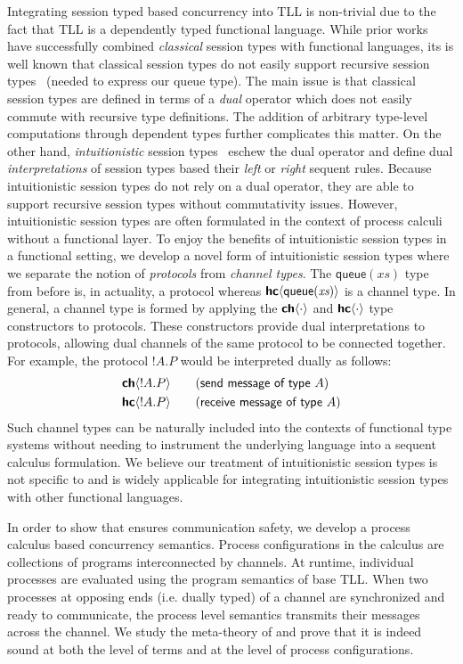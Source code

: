 Integrating session typed based concurrency into TLL is non-trivial due to the
fact that TLL is a dependently typed functional language. While prior
works~\cite{gay10,wadler12} have successfully combined \emph{classical} session
types with functional languages, its is well known that classical session types
do not easily support recursive session types~\cite{gay20} (needed to express
our \textsf{queue} type).  The main issue is that classical session types are
defined in terms of a \emph{dual} operator which does not easily commute with
recursive type definitions. The addition of arbitrary type-level computations
through dependent types further complicates this matter.  On the other hand,
\emph{intuitionistic} session types~\cite{caires10} eschew the dual operator and
define dual \emph{interpretations} of session types based their \emph{left} or
\emph{right} sequent rules.  Because intuitionistic session types do not rely on
a dual operator, they are able to support recursive session types without
commutativity issues. However, intuitionistic session types are often formulated
in the context of process calculi without a functional layer. To enjoy the
benefits of intuitionistic session types in a functional setting, we develop a
novel form of intuitionistic session types where we separate the notion of
\emph{protocols} from \emph{channel types}. The $\textsf{queue}(\textit{xs})$
type from before is, in actuality, a protocol whereas
${\textbf{\textsf{hc}}\langle{\textsf{queue}(\textit{xs})}\rangle}$ is a channel type. In general, a channel type
is formed by applying the ${\textbf{\textsf{ch}}\langle{\cdot}\rangle}$ and ${\textbf{\textsf{hc}}\langle{\cdot}\rangle}$ type constructors to
protocols. These constructors provide dual interpretations to protocols,
allowing dual channels of the same protocol to be connected together. For
example, the protocol $!A. P$ would be interpreted dually as follows:
\begin{alignat*}{2}
  &{\textbf{\textsf{ch}}\langle{!A. P}\rangle}\quad &&(\textsf{send message of type } A) \\
  &{\textbf{\textsf{hc}}\langle{!A. P}\rangle}\quad &&(\textsf{receive message of type } A)
\end{alignat*}
Such channel types can be naturally included into the contexts of functional
type systems without needing to instrument the underlying language into a
sequent calculus formulation.  We believe our treatment of intuitionistic
session types is not specific to \TLLC{} and is widely applicable for
integrating intuitionistic session types with other functional languages.

In order to show that \TLLC{} ensures communication safety, we develop a process
calculus based concurrency semantics. Process configurations in the calculus are
collections of \TLLC{} programs interconnected by channels. At runtime,
individual processes are evaluated using the program semantics of base TLL. When
two processes at opposing ends (i.e. dually typed) of a channel are synchronized
and ready to communicate, the process level semantics transmits their messages
across the channel. We study the meta-theory of \TLLC{} and prove that it is
indeed sound at both the level of terms and at the level of process
configurations.

